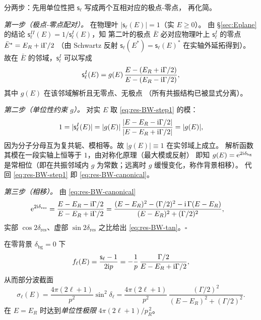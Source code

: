 \begin{proof*}
  分两步：先用单位性把 $\mathsf{s}_\ell$ 写成两个互相对应的极点-零点，
  再化简。

  \emph{第一步（极点-零点配对）。}
  在物理叶 $|\mathsf{s}_\ell(E)|=1$（实 $E\geq 0$）。
  由 \S\ref{sec:Eplane} 的结论
  $\mathsf{s}_\ell^{II}(E)=1/\mathsf{s}_\ell^{I}(E)$，知
  第二叶的极点 $\bar E$ 必对应物理叶上 $\mathsf{s}_\ell^I$ 的零点
  $\bar E^{*}=E_R+\mathrm{i}\Gamma/2$
  （由 Schwartz 反射 $\mathsf{s}_\ell(E^*)=\mathsf{s}_\ell(E)^*$ 在实轴外延拓得到）。
  故在 $\bar E$ 的邻域，$\mathsf{s}_\ell^I$ 可以写成
  \begin{equation}\label{eq:res-BW-step1}
    \mathsf{s}_\ell^I(E)=g(E)\,\frac{E-(E_R+\mathrm{i}\Gamma/2)}{E-(E_R-\mathrm{i}\Gamma/2)},
  \end{equation}
  其中 $g(E)$ 在该邻域解析且无零点、无极点
  （所有共振结构已被显式分离）。

  \emph{第二步（单位性约束 $g$）。}
  对实 $E$ 取 \eqref{eq:res-BW-step1} 的模：
  \begin{equation*}
    1=|\mathsf{s}_\ell^I(E)|=|g(E)|\,
      \frac{|E-E_R-\mathrm{i}\Gamma/2|}{|E-E_R+\mathrm{i}\Gamma/2|}=|g(E)|,
  \end{equation*}
  因为分子分母互为复共轭、模相等。故 $|g(E)|\equiv 1$ 在实邻域上成立。
  解析函数其模在一段实轴上恒等于 $1$，由对称化原理（最大模或反射）
  即知 $g(E)=\mathrm{e}^{2\mathrm{i}\delta_{\mathrm{bg}}}$ 是常相位（即在共振邻域内
  $g$ 为常数；远离时 $g$ 缓慢变化，称作背景相移）。
  代回 \eqref{eq:res-BW-step1} 即 \eqref{eq:res-BW-canonical}。

  \emph{第三步（相移）。}
  由 \eqref{eq:res-BW-canonical}
  \begin{align*}
    \mathrm{e}^{2\mathrm{i}\delta_{\mathrm{res}}}
    &=\frac{E-E_R-\mathrm{i}\Gamma/2}{E-E_R+\mathrm{i}\Gamma/2}
     =\frac{(E-E_R)^2-(\Gamma/2)^2-\mathrm{i}\,\Gamma(E-E_R)}{(E-E_R)^2+(\Gamma/2)^2},
  \end{align*}
  实部 $\cos 2\delta_{\mathrm{res}}$、虚部 $\sin 2\delta_{\mathrm{res}}$
  之比给出 \eqref{eq:res-BW-tan}。$\square$
\end{proof*}

\begin{corollary}\label{cor:res-BW-fl}
  在零背景 $\delta_{\mathrm{bg}}=0$ 下
  \begin{equation}\label{eq:res-BW-fl}
    f_\ell(E)=\frac{\mathsf{s}_\ell-1}{2\mathrm{i} p}
    =-\frac{1}{p}\,\frac{\Gamma/2}{E-E_R+\mathrm{i}\Gamma/2},
  \end{equation}
  从而部分波截面
  \begin{equation}\label{eq:res-BW-sigma-elastic}
    \sigma_\ell(E)=\frac{4\pi(2\ell+1)}{p^2}\sin^2\delta_\ell
    =\frac{4\pi(2\ell+1)}{p^2}\,
      \frac{(\Gamma/2)^2}{(E-E_R)^2+(\Gamma/2)^2}.
  \end{equation}
  在 $E=E_R$ 时达到\emph{单位性极限} $4\pi(2\ell+1)/p_R^{\,2}$。
\end{corollary}

